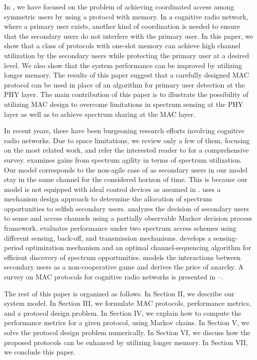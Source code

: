 \documentclass[12pt,draftclsnofoot,onecolumn]{IEEEtran}
\begin{document}
In \cite{park}, we have focused on the problem of achieving coordinated access among
symmetric users by using a protocol with memory.
In a cognitive radio network, where a primary user exists, another kind of coordination is
needed to ensure that the secondary users do not interfere with the primary user.
In this paper, we show that a class of protocols with one-slot memory can achieve high
channel utilization by the secondary users while protecting the primary user
at a desired level. We also show that the system performance can be improved by utilizing
longer memory.
The results of this paper suggest that a carefully
designed MAC protocol can be used in place of an algorithm for primary user detection
at the PHY layer. The main contribution of this paper is to illustrate
the possibility of utilizing MAC design to overcome limitations in
spectrum sensing at the PHY layer as well as to achieve spectrum sharing
at the MAC layer.

In recent years, there have been burgeoning research efforts involving
cognitive radio networks. Due to space limitations, we review only a few of
them, focusing on the most related work, and refer the interested reader to
\cite{akyildiz} for a comprehensive survey. \cite{chou} examines
gains from spectrum agility in terms of spectrum utilization. Our model
corresponds to the non-agile case of \cite{chou} as secondary users in
our model stay in the same channel for the considered horizon of time.
This is because our model is not equipped with ideal control devices
as assumed in \cite{chou}. \cite{fattahi} uses a mechanism design
approach to determine the allocation of spectrum opportunities to selfish secondary
users. \cite{zhao} analyzes the decision of secondary users to sense
and access channels using a partially observable Markov decision process
framework. \cite{shuang} evaluates performance under two spectrum access
schemes using different sensing, back-off, and transmission mechanisms.
\cite{hkim} develops a sensing-period optimization mechanism and an optimal
channel-sequencing algorithm for efficient discovery of spectrum opportunities.
\cite{law} models the interactions between secondary users as a non-cooperative
game and derives the price of anarchy. A survey on MAC protocols for cognitive
radio networks is presented in \cite{wang}--\cite{cormio}.

The rest of this paper is organized as follows. In Section II, we describe
our system model. In Section III, we formulate MAC protocols,
performance metrics, and a protocol design problem. In Section IV, we explain how to compute the
performance metrics for a given protocol, using Markov chains. In Section V,
we solve the protocol design problem numerically.
In Section VI, we discuss how the proposed protocols can be enhanced
by utilizing longer memory.
In Section VII, we conclude this paper.
\end{document}
